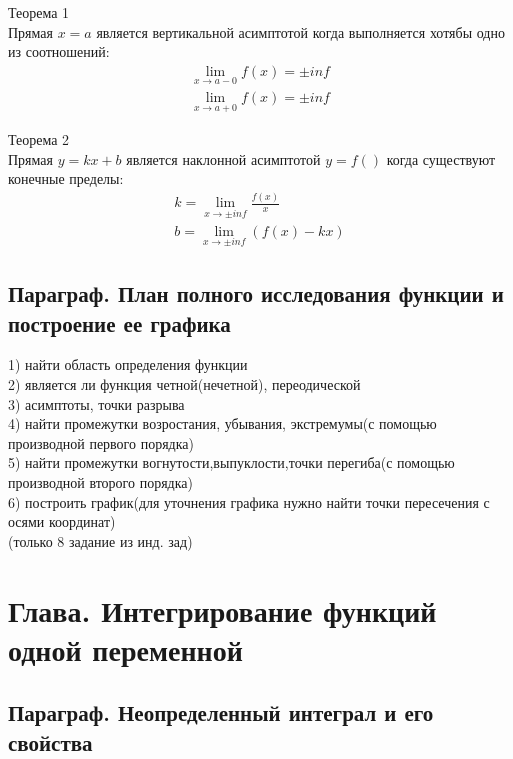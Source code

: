 \documentclass[a4paper, 12pt]{article}
\begin{document}
\begin{mdframed}[backgroundcolor=blue!20] 
       Теорема 1\\
       Прямая $ x = a $ является вертикальной асимптотой когда выполняется хотябы одно из соотношений:
       \begin{align*}
          \lim_{x\to a-0} f(x) = \pm inf\\
          \lim_{x\to a+0} f(x) = \pm inf
        \end{align*}

        Теорема 2\\
        Прямая $ y = kx+b $ является наклонной асимптотой $ y = f() $ когда существуют конечные пределы:
        \begin{align*}
            k = \lim_{x\to \pm inf} \frac{f(x)}{x}\\
            b = \lim_{x\to \pm inf} (f(x) - kx)
          \end{align*}
    \end{mdframed}

\subsection{Параграф. План полного исследования функции и построение ее графика}
 
1) найти область определения функции\\
2) является ли функция четной(нечетной), переодической\\
3) асимптоты, точки разрыва\\
4) найти промежутки возростания, убывания, экстремумы(с помощью производной первого порядка)\\
5) найти промежутки вогнутости,выпуклости,точки перегиба(с помощью производной второго порядка)\\
6) построить график(для уточнения графика нужно найти точки пересечения с осями координат)\\

(только 8 задание из инд. зад)

\section{Глава. Интегрирование функций одной переменной}

\subsection{Параграф. Неопределенный интеграл и его свойства}
\end{document}
